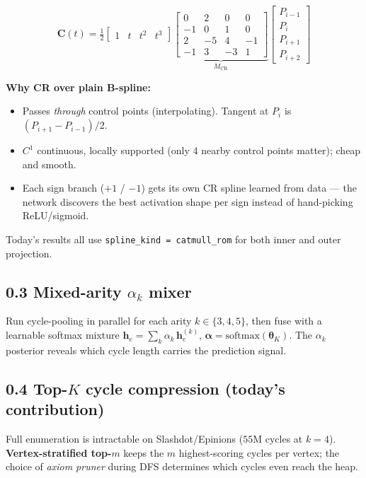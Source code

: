 \documentclass[11pt,a4paper]{article}
\newcommand{\code}[1]{\texttt{\small #1}}
\begin{document}
\begin{equation*}
\mathbf{C}(t) = \tfrac{1}{2}
\begin{bmatrix} 1 & t & t^2 & t^3 \end{bmatrix}
\underbrace{\begin{bmatrix}
 0 &  2 &  0 &  0 \\
-1 &  0 &  1 &  0 \\
 2 & -5 &  4 & -1 \\
-1 &  3 & -3 &  1
\end{bmatrix}}_{M_{\mathrm{CR}}}
\begin{bmatrix} P_{i-1} \\ P_i \\ P_{i+1} \\ P_{i+2} \end{bmatrix}
\end{equation*}

\textbf{Why CR over plain B-spline:}
\begin{itemize}
\item Passes \emph{through} control points (interpolating).
      Tangent at $P_i$ is $(P_{i+1} - P_{i-1})/2$.
\item $C^1$ continuous, locally supported (only 4 nearby control
      points matter); cheap and smooth.
\item Each sign branch ($+1$ / $-1$) gets its own CR spline learned
      from data — the network discovers the best activation shape
      per sign instead of hand-picking ReLU/sigmoid.
\end{itemize}
Today's results all use \code{spline\_kind = catmull\_rom} for both
inner and outer projection.

\subsection*{0.3 Mixed-arity $\alpha_k$ mixer}
Run cycle-pooling in parallel for each arity $k \in \{3, 4, 5\}$,
then fuse with a learnable softmax mixture
\(\mathbf{h}_e = \sum_k \alpha_k\,\mathbf{h}_e^{(k)}\),
$\boldsymbol{\alpha} = \mathrm{softmax}(\boldsymbol{\theta}_K)$.
The $\alpha_k$ posterior reveals which cycle length carries the
prediction signal.

\subsection*{0.4 Top-$K$ cycle compression (today's contribution)}
Full enumeration is intractable on Slashdot/Epinions ($55$M cycles
at $k{=}4$). \textbf{Vertex-stratified top-$m$} keeps the $m$
highest-scoring cycles per vertex; the choice of \emph{axiom pruner}
during DFS determines which cycles even reach the heap.
\end{document}
